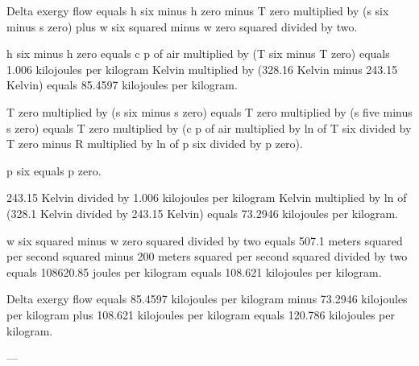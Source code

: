 Delta exergy flow equals h six minus h zero minus T zero multiplied by (s six minus s zero) plus w six squared minus w zero squared divided by two.  

h six minus h zero equals c p of air multiplied by (T six minus T zero) equals 1.006 kilojoules per kilogram Kelvin multiplied by (328.16 Kelvin minus 243.15 Kelvin) equals 85.4597 kilojoules per kilogram.  

T zero multiplied by (s six minus s zero) equals T zero multiplied by (s five minus s zero) equals T zero multiplied by (c p of air multiplied by ln of T six divided by T zero minus R multiplied by ln of p six divided by p zero).  

p six equals p zero.  

243.15 Kelvin divided by 1.006 kilojoules per kilogram Kelvin multiplied by ln of (328.1 Kelvin divided by 243.15 Kelvin) equals 73.2946 kilojoules per kilogram.  

w six squared minus w zero squared divided by two equals 507.1 meters squared per second squared minus 200 meters squared per second squared divided by two equals 108620.85 joules per kilogram equals 108.621 kilojoules per kilogram.  

Delta exergy flow equals 85.4597 kilojoules per kilogram minus 73.2946 kilojoules per kilogram plus 108.621 kilojoules per kilogram equals 120.786 kilojoules per kilogram.  

---